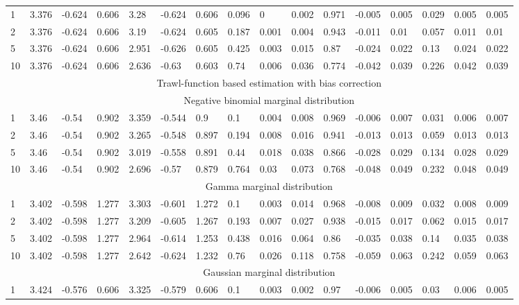 \documentclass{article}
\theoremstyle{plain}
\theoremstyle{definition}
\theoremstyle{remark}
\begin{document}
\begin{appendix}
{\begin{table}[ht]
\begin{tabular}{l|lll|lll|lll|lll|lll}
  1 & 3.376 & -0.624 & 0.606 & 3.28 & -0.624 & 0.606 & 0.096 & 0 & 0.002 & 0.971 & -0.005 & 0.005 & 0.029 & 0.005 & 0.005 \\ 
  2 & 3.376 & -0.624 & 0.606 & 3.19 & -0.624 & 0.605 & 0.187 & 0.001 & 0.004 & 0.943 & -0.011 & 0.01 & 0.057 & 0.011 & 0.01 \\ 
  5 & 3.376 & -0.624 & 0.606 & 2.951 & -0.626 & 0.605 & 0.425 & 0.003 & 0.015 & 0.87 & -0.024 & 0.022 & 0.13 & 0.024 & 0.022 \\ 
  10 & 3.376 & -0.624 & 0.606 & 2.636 & -0.63 & 0.603 & 0.74 & 0.006 & 0.036 & 0.774 & -0.042 & 0.039 & 0.226 & 0.042 & 0.039 \\ 
   \midrule	
  &\multicolumn{15}{c}{Trawl-function based estimation with bias correction}\\ \midrule
  &\multicolumn{15}{c}{Negative binomial marginal distribution}\\
 1 & 3.46 & -0.54 & 0.902 & 3.359 & -0.544 & 0.9 & 0.1 & 0.004 & 0.008 & 0.969 & -0.006 & 0.007 & 0.031 & 0.006 & 0.007 \\ 
  2 & 3.46 & -0.54 & 0.902 & 3.265 & -0.548 & 0.897 & 0.194 & 0.008 & 0.016 & 0.941 & -0.013 & 0.013 & 0.059 & 0.013 & 0.013 \\ 
  5 & 3.46 & -0.54 & 0.902 & 3.019 & -0.558 & 0.891 & 0.44 & 0.018 & 0.038 & 0.866 & -0.028 & 0.029 & 0.134 & 0.028 & 0.029 \\ 
  10 & 3.46 & -0.54 & 0.902 & 2.696 & -0.57 & 0.879 & 0.764 & 0.03 & 0.073 & 0.768 & -0.048 & 0.049 & 0.232 & 0.048 & 0.049 \\ 
   \midrule
  &\multicolumn{15}{c}{Gamma marginal distribution}\\
 1 & 3.402 & -0.598 & 1.277 & 3.303 & -0.601 & 1.272 & 0.1 & 0.003 & 0.014 & 0.968 & -0.008 & 0.009 & 0.032 & 0.008 & 0.009 \\ 
  2 & 3.402 & -0.598 & 1.277 & 3.209 & -0.605 & 1.267 & 0.193 & 0.007 & 0.027 & 0.938 & -0.015 & 0.017 & 0.062 & 0.015 & 0.017 \\ 
  5 & 3.402 & -0.598 & 1.277 & 2.964 & -0.614 & 1.253 & 0.438 & 0.016 & 0.064 & 0.86 & -0.035 & 0.038 & 0.14 & 0.035 & 0.038 \\ 
  10 & 3.402 & -0.598 & 1.277 & 2.642 & -0.624 & 1.232 & 0.76 & 0.026 & 0.118 & 0.758 & -0.059 & 0.063 & 0.242 & 0.059 & 0.063 \\ 
   \midrule
  &\multicolumn{15}{c}{Gaussian marginal distribution}\\
 1 & 3.424 & -0.576 & 0.606 & 3.325 & -0.579 & 0.606 & 0.1 & 0.003 & 0.002 & 0.97 & -0.006 & 0.005 & 0.03 & 0.006 & 0.005 \\ 

\end{tabular}
\end{table}}
\end{appendix}
\end{document}
